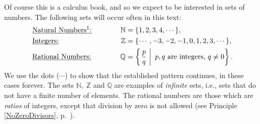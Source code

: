 Of course this is a calculus book, and so  we expect to be interested
in sets of numbers.  The following sets will occur often in this text:
\begin{alignat}{3} 
&\text{\underline{Natural Numbers\footnotemark:}}
        &\qquad&&\mathbb{N}&=\{1,2,3,4,\cdots\},\\ 
&\text{\underbar{Integers:}}&&&
        \mathbb{Z}&=\{\cdots,-3,-2,-1,0,1,2,3,\cdots\},\\
&\text{\underline{Rational Numbers:}}&&&\mathbb{Q}&=
        \left\{\left.\frac{p}q\ \right|\ p,q\text{ are integers, }q\ne0 
\right\}.\end{alignat} 
We use the dots ($\cdots$) to show that the established pattern continues,
in these cases forever.\footnotemark{} 
The sets  $\mathbb{N,\ Z}$ and $\mathbb{Q}$ are
examples of {\it infinite} sets, i.e., sets that do not have a finite
number of elements.  The rational
numbers are those which are {\it ratios} of integers, except that
division by zero is not allowed (see Principle \ref{NoZeroDivisors},
p.\ \pageref{NoZeroDivisors}).  

